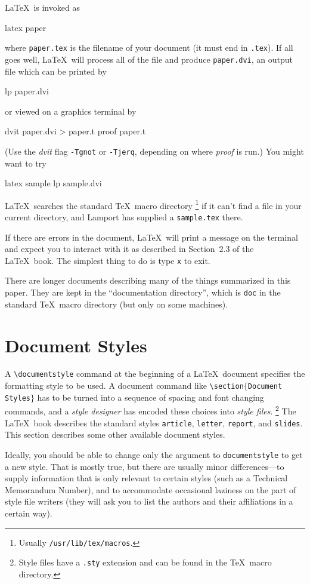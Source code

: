 \LaTeX\ is invoked as
\begin{eg}
	latex paper
\end{eg}
where \verb|paper.tex| is the filename of your document
(it must end in \verb|.tex|).
If all goes well, \LaTeX\ will process all of the file
and produce \verb|paper.dvi|, an output file which can be
printed by
\begin{eg}
	lp paper.dvi
\end{eg}
or viewed on a graphics terminal by
\begin{eg}
	dvit paper.dvi > paper.t
	proof paper.t
\end{eg}
(Use the {\em dvit\/} flag \verb|-Tgnot| or \verb|-Tjerq|, depending
on where {\em proof\/} is run.)
You might want to try
\begin{eg}
	latex sample
	lp sample.dvi
\end{eg}
\LaTeX\ searches the standard \TeX\ macro directory%
\footnote{Usually \verb|/usr/lib/tex/macros|.}
if it can't find a file in your current directory,
and Lamport has supplied a \verb|sample.tex| there.

If there are errors in the document, \LaTeX\ will print a message
on the terminal and expect you to interact with it as described
in Section~2.3 of the \LaTeX\ book.  The simplest thing to do
is type \verb|x| to exit.

There are longer documents describing many of the things summarized
in this paper.  They are kept in the ``documentation directory'',
which is {\tt doc} in the standard \TeX\ macro directory (but only
on some machines).

\section{Document Styles}

A \verb|\documentstyle| command at the beginning of a \LaTeX\ document
specifies the formatting style to be used.
A document command like {\tt \verb|\|section$\{$Document Styles$\}$} has to be
turned into a sequence of spacing and font changing commands, and
a {\em style designer\/} has encoded these choices into {\em style files}.%
\footnote{Style files have a \verb|.sty| extension and can be found
in the \TeX\ macro directory.}
The \LaTeX\ book describes the standard styles {\tt article},
{\tt letter}, {\tt report}, and {\tt slides}.
This section describes some other available document styles.

Ideally, you should be able to change only the argument to
\verb|documentstyle| to get a new style.
That is mostly true, but there are usually minor differences---to
supply information that is only relevant to certain styles (such as
a Technical Memorandum Number), and to accommodate occasional
laziness on the part of style file writers (they will ask you to
list the authors and their affiliations in a certain way).

